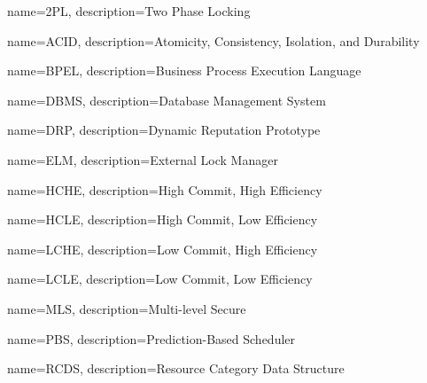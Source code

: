 

{
    name=2PL,
    description={Two Phase Locking}
}

{
    name=ACID,
    description={Atomicity, Consistency, Isolation, and Durability}
}

{
    name=BPEL,
    description={Business Process Execution Language}
}

{
    name=DBMS,
    description={Database Management System}
}

{
    name=DRP,
    description={Dynamic Reputation Prototype}
}

{
    name=ELM,
    description={External Lock Manager}
}

{
    name=HCHE,
    description={High Commit, High Efficiency}
}

{
    name=HCLE,
    description={High Commit, Low Efficiency}
}

{
    name=LCHE,
    description={Low Commit, High Efficiency}
}

{
    name=LCLE,
    description={Low Commit, Low Efficiency}
}

{
    name=MLS,
    description={Multi-level Secure}
}

{
    name=PBS,
    description={Prediction-Based Scheduler}
}

{
    name=RCDS,
    description={Resource Category Data Structure}
}
